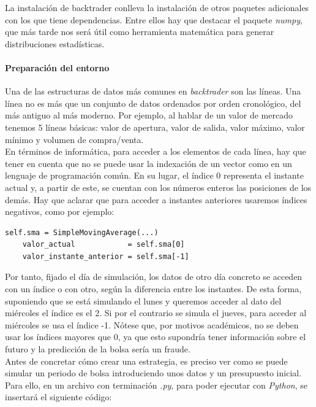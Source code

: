 		La instalaci\'on de backtrader conlleva la instalaci\'on de otros paquetes adicionales con los que tiene dependencias. Entre ellos hay que destacar el paquete \textit{numpy}, que m\'as tarde nos ser\'a \'util como herramienta matem\'atica para generar distribuciones estad\'isticas.\\
		
		
		\paragraph{Preparaci\'on del entorno}
		
		Una de las estructuras de datos m\'as comunes en \textit{backtrader} son las l\'ineas. Una l\'inea no es m\'as que un conjunto de datos ordenados por orden cronol\'ogico, del m\'as antiguo al m\'as moderno. Por ejemplo, al hablar de un valor de mercado tenemos 5 l\'ineas b\'asicas: valor de apertura, valor de salida, valor m\'aximo, valor m\'inimo y volumen de compra/venta. \\
		
		En t\'erminos de inform\'atica, para acceder a los elementos de cada l\'inea, hay que tener en cuenta que no se puede usar la indexaci\'on de un vector como en un lenguaje de programaci\'on com\'un. En su lugar, el \'indice 0 representa el instante actual y, a partir de este, se cuentan con los n\'umeros enteros las posiciones de los dem\'as. Hay que aclarar que para acceder a instantes anteriores usaremos \'indices negativos, como por ejemplo:\\
		
		\begin{lstlisting}[basicstyle=\tiny]
	self.sma = SimpleMovingAverage(...)
	valor_actual            = self.sma[0]
	valor_instante_anterior = self.sma[-1]
		\end{lstlisting}
		
		Por tanto, fijado el d\'ia de simulaci\'on, los datos de otro d\'ia concreto se acceden con un \'indice o con otro, seg\'un la diferencia entre los instantes. De esta forma, suponiendo que se est\'a simulando el lunes y queremos acceder al dato del mi\'ercoles el \'indice es el 2. Si por el contrario se simula el jueves, para acceder al mi\'ercoles se usa el \'indice -1. N\'otese que, por motivos acad\'emicos, no se deben usar los \'indices mayores que 0, ya que esto supondr\'ia tener informaci\'on sobre el futuro y la predicci\'on de la bolsa ser\'ia un fraude.\\
		
		Antes de concretar c\'omo crear una estrategia, es preciso ver como se puede simular un periodo de bolsa introduciendo unos datos y un presupuesto inicial. Para ello, en un archivo con terminaci\'on \textit{.py}, para poder ejecutar con \textit{Python}, se insertar\'a el siguiente c\'odigo:\\
		
